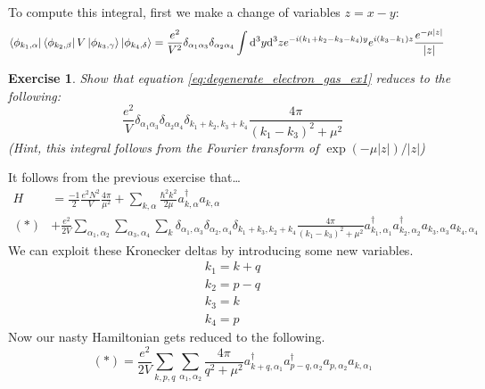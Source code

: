 \documentclass{article}
\newtheorem{exercise}{Exercise}[section]
\begin{document}
To compute this integral, first we make a change of variables $z = x-y$:
\begin{align}\bra{\phi_{k_1,\alpha}}\bra{\phi_{k_2,\beta}}V\ket{\phi_{k_3,\gamma}}\ket{\phi_{k_4,\delta}} &= \frac{e^2}{V^2}\delta_{\alpha_1 \alpha_3}\delta_{\alpha_2\alpha_4}\int \dd^3 y \dd^3 z e^{-i(k_1+k_2-k_3-k_4)y}e^{i(k_3-k_1)z}\frac{e^{-\mu|z|}}{|z|}
\label{eq:degenerate_electron_gas_ex1}
\end{align}
\begin{exercise}
Show that equation \eqref{eq:degenerate_electron_gas_ex1} reduces to the following:
\[\frac{e^2}{V}\delta_{\alpha_1 \alpha_3}\delta_{\alpha_2\alpha_4}\delta_{k_1+k_2,k_3+k_4}\frac{4\pi}{(k_1-k_3)^2+\mu^2}\]
(Hint, this integral follows from the Fourier transform of $\exp(-\mu|z|)/|z|$)
\end{exercise}
It follows from the previous exercise that\dots
\begin{align}
    H&=\frac{-1}{2}\frac{e^2 N^2}{V}\frac{4\pi}{\mu^2} +
    \sum_{k,\alpha}\frac{\hbar^2 k^2}{2\mu}a_{k,\alpha}^\dagger a_{k,\alpha} \\ (\ast) & + \frac{e^2}{2V}\sum_{\alpha_1,\alpha_2}\sum_{\alpha_3,\alpha_4}\sum_k \delta_{\alpha_1,\alpha_3}\delta_{\alpha_2,\alpha_4}\delta_{k_1+k_3,k_2+k_4}\frac{4\pi}{(k_1-k_3)^2+\mu^2}a_{k_1,\alpha_1}^\dagger a_{k_2,\alpha_2}^\dagger a_{k_3,\alpha_3}a_{k_4,\alpha_4}
\end{align}
We can exploit these Kronecker deltas by introducing some new variables.
\begin{align*}
k_1=k+q\\
k_2=p-q\\
k_3=k\\
k_4=p
\end{align*}
Now our nasty Hamiltonian gets reduced to the following.
\[(\ast) = \frac{e^2}{2V}\sum_{k,p,q}\sum_{\alpha_1,\alpha_2}\frac{4\pi}{q^2+\mu^2}a_{k+q,\alpha_1}^\dagger a_{p-q,\alpha_2}^\dagger a_{p,\alpha_2}a_{k,\alpha_1}\]
\end{document}
